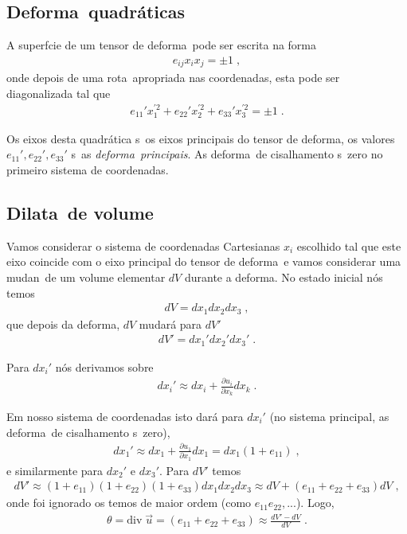 \subsection{Deforma\coes\ quadr\'aticas}

A superf\ih cie de um tensor de deforma\cao\ pode ser escrita
na forma
\begin{eqnarray}
e_{ij} x_i x_j = \pm 1 \; ,
\end{eqnarray}
onde depois de uma rota\cao\ apropriada nas coordenadas, esta
pode ser diagonalizada tal que
\begin{eqnarray}
e_{11}' x_1^{'2}+e_{22}' x_2^{'2}+e_{33}' x_3^{'2} = \pm 1 \; .
\end{eqnarray}

Os eixos desta quadr\'atica s\ao\ os eixos principais do tensor
de deforma\cao, os valores $e_{11}', e_{22}',  e_{33}'$ s\ao\ as
{\it deforma\coes\ principais}. As deforma\coes\ de cisalhamento
s\ao\ zero no primeiro sistema de coordenadas.


\subsection{Dilata\cao\ de volume}

Vamos considerar o sistema de coordenadas Cartesianas $x_i$
escolhido tal que este eixo coincide com o eixo principal do
tensor de deforma\cao\ e vamos considerar uma mudan\ca\ de
um volume elementar $dV$ durante a deforma\cao. No estado
inicial n\'os temos
\begin{eqnarray}
dV = dx_1 dx_2 dx_3 \; ,
\end{eqnarray}
que depois da deforma\cao, $dV$ mudar\'a para $dV'$
\begin{eqnarray}
dV' = dx_1' dx_2' dx_3' \; .
\end{eqnarray}

Para $dx_i'$ n\'os derivamos sobre
\begin{eqnarray}
dx_i' \approx  dx_i + \frac{\partial u_i}{\partial x_k} dx_k \; .
\end{eqnarray}

Em nosso sistema de coordenadas isto dar\'a para $dx_i'$
(no sistema principal, as deforma\coes\ de cisalhamento
s\ao\ zero),
\begin{eqnarray}
dx_1' \approx  dx_1 + \frac{\partial u_1}{\partial x_1} dx_1
= dx_1(1+e_{11}) \;,
\end{eqnarray}
e similarmente para $dx_2'$ e $dx_3'$. Para $dV'$ temos
\begin{eqnarray}
dV' \approx  (1+e_{11})(1+e_{22})(1+e_{33})dx_1 dx_2 dx_3
\approx  dV + (e_{11} + e_{22} + e_{33}) dV \; ,
\end{eqnarray}
onde foi ignorado os temos de maior ordem (como
$e_{11}e_{22}, ...$). Logo,
\begin{eqnarray}
\theta = \mbox{div}\; \vec{u} = (e_{11} + e_{22} + e_{33})
\approx  \frac{dV'-dV}{dV} \; .
\end{eqnarray}

